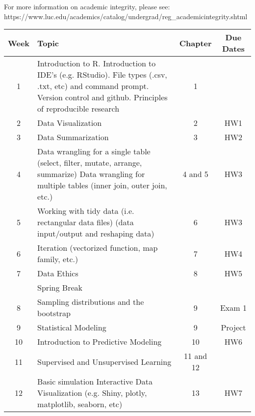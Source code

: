 \documentclass{article}\usepackage[]{graphicx}\usepackage[]{color}
\begin{document}
For more information on academic integrity, please see: \\
https://www.luc.edu/academics/catalog/undergrad/reg\_academicintegrity.shtml





\begin{center}
\begin{tabular}{ |c|p{5cm}|c|c| } 
 \hline
 Week & Topic & Chapter & Due Dates\\
  \hline 
 1 & Introduction to R.   Introduction to IDE's (e.g. RStudio).  File types (.csv, .txt, etc) and command prompt. Version control and github. Principles of reproducible research & 1 &  \\ 
   \hline 
 2 & Data Visualization & 2 & HW1 \\
   \hline 
  3 & Data Summarization & 3 & HW2 \\
    \hline 
    4 &Data wrangling for a single table (select, filter, mutate, arrange, summarize)
Data wrangling for multiple tables (inner join, outer join, etc.)
 & 4 and 5 & HW3 \\
   \hline 
     5 & Working with tidy data (i.e. rectangular data files) (data input/output and reshaping data) & 6 & HW3 \\ 
 \hline
      6 & Iteration (vectorized function, map family, etc.)& 7 & HW4\\ 
      \hline
            7 & Data Ethics & 8 & HW5\\ 
            \hline 
                        & Spring Break & \\ 
            \hline
                        8 & Sampling distributions and the bootstrap & 9 & Exam 1\\ 
                                    \hline 
                        9 &Statistical Modeling & 9 & Project\\ 
                                                            \hline 
                        10 & Introduction to Predictive Modeling & 10 & HW6 \\ 
                                                                                    \hline 
                        11 & Supervised and Unsupervised Learning & 11 and 12 & \\ 
                                                                                    \hline 
                        12 & Basic simulation Interactive Data Visualization (e.g. Shiny, plotly, matplotlib, seaborn, etc) & 13 & HW7 \\ 

\end{tabular}
\end{center}
\end{document}
